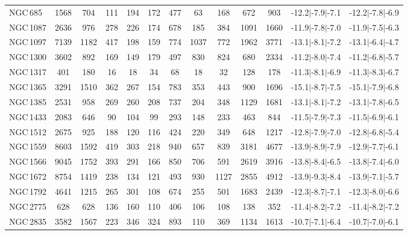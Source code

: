\begin{table*}
\begin{center}
\begin{tabular}{lcccccccccccc}
NGC\,685 & 1568 & 704 & 111 & 194 & 172 & 477 & 63 & 168 & 672 & 903 & -12.2$\vert$-7.9$\vert$-7.1 & -12.2$\vert$-7.8$\vert$-6.9 \\ 
NGC\,1087 & 2636 & 976 & 278 & 226 & 174 & 678 & 185 & 384 & 1091 & 1660 & -11.9$\vert$-7.8$\vert$-7.0 & -11.9$\vert$-7.5$\vert$-6.3 \\ 
NGC\,1097 & 7139 & 1182 & 417 & 198 & 159 & 774 & 1037 & 772 & 1962 & 3771 & -13.1$\vert$-8.1$\vert$-7.2 & -13.1$\vert$-6.4$\vert$-4.7 \\ 
NGC\,1300 & 3602 & 892 & 169 & 149 & 179 & 497 & 830 & 824 & 680 & 2334 & -11.2$\vert$-8.0$\vert$-7.4 & -11.2$\vert$-6.8$\vert$-5.7 \\ 
NGC\,1317 & 401 & 180 & 16 & 18 & 34 & 68 & 18 & 32 & 128 & 178 & -11.3$\vert$-8.1$\vert$-6.9 & -11.3$\vert$-8.3$\vert$-6.7 \\ 
NGC\,1365 & 3291 & 1510 & 362 & 267 & 154 & 783 & 353 & 443 & 900 & 1696 & -15.1$\vert$-8.7$\vert$-7.5 & -15.1$\vert$-7.9$\vert$-6.8 \\ 
NGC\,1385 & 2531 & 958 & 269 & 260 & 208 & 737 & 204 & 348 & 1129 & 1681 & -13.1$\vert$-8.1$\vert$-7.2 & -13.1$\vert$-7.8$\vert$-6.5 \\ 
NGC\,1433 & 2083 & 646 & 90 & 104 & 99 & 293 & 148 & 233 & 463 & 844 & -11.5$\vert$-7.9$\vert$-7.3 & -11.5$\vert$-6.9$\vert$-6.1 \\ 
NGC\,1512 & 2675 & 925 & 188 & 120 & 116 & 424 & 220 & 349 & 648 & 1217 & -12.8$\vert$-7.9$\vert$-7.0 & -12.8$\vert$-6.8$\vert$-5.4 \\ 
NGC\,1559 & 8603 & 1592 & 419 & 303 & 218 & 940 & 657 & 839 & 3181 & 4677 & -13.9$\vert$-8.9$\vert$-7.9 & -12.9$\vert$-7.7$\vert$-6.1 \\ 
NGC\,1566 & 9045 & 1752 & 393 & 291 & 166 & 850 & 706 & 591 & 2619 & 3916 & -13.8$\vert$-8.4$\vert$-6.5 & -13.8$\vert$-7.4$\vert$-6.0 \\ 
NGC\,1672 & 8754 & 1419 & 238 & 134 & 121 & 493 & 930 & 1127 & 2855 & 4912 & -13.9$\vert$-9.3$\vert$-8.4 & -13.9$\vert$-7.1$\vert$-5.7 \\ 
NGC\,1792 & 4641 & 1215 & 265 & 301 & 108 & 674 & 255 & 501 & 1683 & 2439 & -12.3$\vert$-8.7$\vert$-7.1 & -12.3$\vert$-8.0$\vert$-6.6 \\ 
NGC\,2775 & 628 & 628 & 136 & 160 & 110 & 406 & 106 & 108 & 138 & 352 & -11.4$\vert$-8.2$\vert$-7.2 & -11.4$\vert$-8.2$\vert$-7.2 \\ 
NGC\,2835 & 3582 & 1567 & 223 & 346 & 324 & 893 & 110 & 369 & 1134 & 1613 & -10.7$\vert$-7.1$\vert$-6.4 & -10.7$\vert$-7.0$\vert$-6.1 \\ 

\end{tabular}
\end{center}
\end{table*}
